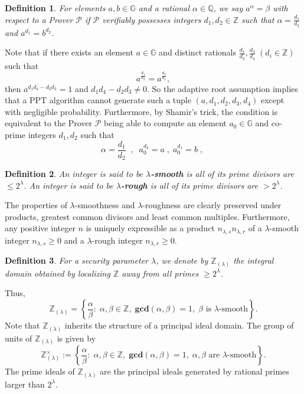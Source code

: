 \documentclass[11pt, lettersize, notitlepage, leqno, footskip=0.6cm]{article}
\newcommand{\bz}{\mathbb Z}
\newcommand{\bq}{\mathbb Q}
\newcommand{\mc}{\mathcal}
\newcommand{\mb}{\mathbb}
\newcommand{\mbf}{\mathbf}
\newcommand{\al}{\alpha}
\newcommand{\be}{\beta}
\newcommand{\lam}{\lambda}
\newcommand{\lamb}{\lambda}
\newcommand{\bzlam}{\bz_{(\lam)}}
\newcommand{\mP}{\mc{P}}
\newcommand{\vs}{\vspace{-0.15cm}}
\newcommand{\noin}{\noindent}
\newcommand{\GCD}{\mbf{gcd}}
\newtheorem{Def}{Definition}[section]
\numberwithin{equation}{section}
\begin{document}

\begin{Def} For elements $a, b\in\mb{G}$ and a rational $\al\in\bq$, we say $a^{\al} = \be$ with respect to a Prover $\mP$ if $\mP$ verifiably possesses integers $d_1,d_2\in\bz$ such that $\al = \frac{d_1}{d_2}$ and  $a^{d_1} = b^{d_2}$.\end{Def}

\noin Note that if there exists an element $a\in\mb{G}$ and distinct rationals $\frac{d_1}{d_2}, \frac{d_3}{d_4}\;(d_i\in\bz)$ such that \vs $$a^{\frac{d_1}{d_2}} = a^{\frac{d_3}{d_4}},$$ then $a^{d_1d_4-d_2d_3} = 1$ and $d_1d_4-d_2d_3\neq 0$. So the adaptive root assumption implies that a PPT algorithm cannot generate such a tuple $(a,d_1,d_2,d_3,d_4)$ except with negligible probability. Furthermore, by Shamir's trick, the condition is equivalent to the Prover $\mP$ being able to compute an element $a_0\in\mb{G}$ and co-prime integers $d_1,d_2$ such that \vs $$\al = \frac{d_1}{d_2}\;\;,\;\;a_0^{d_2} =a\;,\; a_0^{d_1} =b\;,\; $$


\begin{Def} An integer is said to be \textbf{$\lamb$-smooth} is all of its prime divisors are $\leq 2^{\lamb}$. An integer is said to be \textbf{$\lamb$-rough} is all of its prime divisors are $> 2^{\lamb}$.\end{Def}

\noindent The properties of $\lamb$-smoothness and $\lamb$-roughness are clearly preserved under products, greatest common divisors and least common multiples. Furthermore, any positive integer $n$ is uniquely expressible as a product $n_{{\lam,s}}n_{{\lam,r}}$ of a $\lam$-smooth integer $n_{{\lam,s}}\geq 0$ and a $\lam$-rough integer $n_{{\lam,r}}\geq 0$.

\begin{Def} For a security parameter $\lamb$, we denote by $\bz_{(\lamb)}$ the integral domain obtained by localizing $\bz$ away from all primes $\geq 2^{\lamb}$. \end{Def}

\noindent Thus, \vs $$\bz_{(\lamb)} = \left\{\frac{\al}{\be}:\; \al,\be\in\bz,\;\GCD(\al,\be) = 1,\; \be \text{ is } \lamb\text{-smooth}\right\}.$$ Note that $\bz_{(\lamb)}$ inherits the structure of a principal ideal domain. The group of units of $\bzlam$ is given by $$\bzlam^{\times} := \left\{\frac{\al}{\be}:\; \al,\be\in\bz,\;\GCD(\al,\be) = 1,\; \al, \be \text{ are } \lamb\text{-smooth}\right\}. $$ The prime ideals of $\bz_{(\lamb)}$ are the principal ideals generated by rational primes larger than $2^{\lamb}$.
\end{document}
